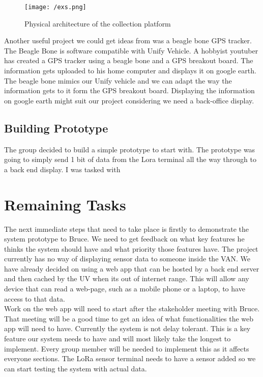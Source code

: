 \documentclass[a4paper,12pt]{article}
\begin{document}
\begin{figure}[h!]
\begin{center}
\texttt{[image: /exs.png]}
\caption{Physical architecture of the collection platform}
\label{figure:exs1}
\end{center}
\end{figure}

Another useful project we could get ideas from was a beagle bone GPS tracker. The Beagle Bone is software compatible with Unify Vehicle. A hobbyist youtuber has created a GPS tracker using a beagle bone and a GPS breakout board. The information gets uploaded to his home computer and displays it on google earth. The beagle bone mimics our Unify vehicle and we can adapt the way the information gets to it form the GPS breakout board. Displaying the information on google earth might suit our project considering we need a back-office display.\\

\subsection{Building Prototype}

The group decided to build a simple prototype to start with. The prototype was going to simply send 1 bit of data from the Lora terminal all the way through to a back end display. I was tasked with 

\clearpage
\section{Remaining Tasks}
The next immediate steps that need to take place is firstly to demonstrate the system prototype to Bruce. We need to get feedback on what key features he thinks the system should have and what priority those features have. The project currently has no way of displaying sensor data to someone inside the VAN. We have already decided on using a web app that can be hosted by a back end server and then cached by the UV when its out of internet range. This will allow any device that can read a web-page, such as a mobile phone or a laptop, to have access to that data.\\

Work on the web app will need to start after the stakeholder meeting with Bruce. That meeting will be a good time to get an idea of what functionalities the web app will need to have. Currently the system is not delay tolerant. This is a key feature our system needs to have and will most likely take the longest to implement. Every group member will be needed to implement this as it affects everyone sections. The LoRa sensor terminal needs to have a sensor added so we can start testing the system with actual data.\\
\end{document}
